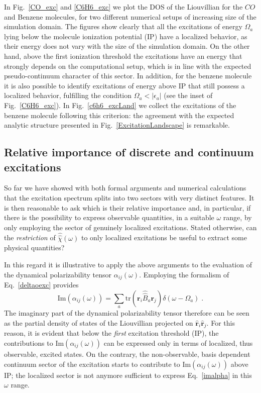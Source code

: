 \documentclass[reprint,aps,prb]{revtex4-1}
\newcommand{\eps}{\epsilon}
\newcommand{\be}{\begin{equation}}
\newcommand{\ee}{\end{equation}}
\newcommand{\lb}{\label}
\newcommand{\op}[1]{\hat {#1}}
\newcommand{\sop}[1]{\op{\op {#1}}}
\newcommand{\trace}[1]{\mathrm{tr}\left(#1\right)}
\begin{document}
In Fig.~\ref{CO_exc} and \ref{C6H6_exc} we plot the DOS of the Liouvillian for the $CO$  and Benzene molecules,
for two different numerical setups of increasing size of the simulation domain.
The figures show clearly that all the excitations of energy $\Omega_a$ lying below the
molecule ionization potential (IP) have a localized behavior, as their energy does not vary with the size of the simulation domain.
On the other hand, above the first ionization threshold the excitations have an energy that strongly depends on the computational
setup, which is in line with the expected pseudo-continuum character of this sector.
In addition, for the benzene molecule it is also possible to
identify excitations of energy above IP that still possess a localized behavior, fulfilling the condition $\Omega_a < |\eps_a|$ (see the inset of
Fig.~\ref{C6H6_exc}). In Fig.~\ref{c6h6_excLand} we collect the excitations of the benzene molecule following this criterion:
the agreement with the expected analytic structure presented in Fig.~\ref{ExcitationLandscape} is remarkable.

\subsection{Relative importance of discrete and continuum excitations}

So far we have showed with both formal arguments and numerical calculations that the excitation spectrum splits into two sectors with very distinct features.
It is then reasonable to ask which is their relative importance and, in particular, if there is the possibility to express observable quantities, in a suitable $\omega$ range, by only employing the sector of genuinely localized excitations.
Stated otherwise, can the \emph{restriction} of $\sop \chi(\omega)$ to only localized excitations be useful to extract some physical quantities?

In this regard it is illustrative to apply the above arguments to the evaluation of the dynamical polarizability tensor $\alpha_{ij}(\omega)$.
Employing the formalism of Eq.~\eqref{deltaoexc} provides
\be\lb{imalpha}
\mathrm{Im}\left(\alpha_{ij}(\omega) \right) =
\sum_{a} \trace{\mathbf r_i \sop B_a \mathbf r_j} \delta(\omega - \Omega_a) \;.
\ee
The imaginary part of the dynamical polarizability tensor therefore can be seen as the partial density of states of the Liouvillian projected on
$\op{\mathbf r}_i\op{\mathbf r}_j$. For this reason, it is evident that below the \emph{first} excitation threshold (IP), the contributions to $\mathrm{Im}\left(\alpha_{ij}(\omega)\right)$ can be expressed only in terms of localized, thus observable, excited states. On the contrary, the non-observable, basis dependent continuum sector of the excitation starts to contribute to $\mathrm{Im}\left(\alpha_{ij}(\omega)\right)$ above IP; the localized sector is not anymore sufficient to express Eq.~\eqref{imalpha} in this $\omega$ range.
\end{document}
